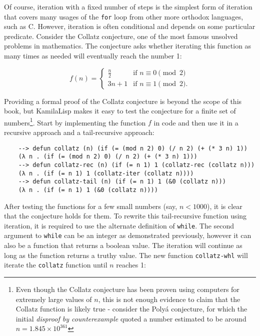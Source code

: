 Of course, iteration with a fixed number of steps is the simplest form of iteration that covers many usages of the \verb|for| loop from other more orthodox languages, such as C. However, iteration is often conditional and depends on some particular predicate. Consider the Collatz conjecture, one of the most famous unsolved problems in mathematics. The conjecture asks whether iterating this function as many times as needed will eventually reach the number 1:

\begin{equation*}
    f(n)={\begin{cases}{\frac {n}{2}}&{\text{if }}n\equiv 0{\pmod {2}}\\[4px]3n+1&{\text{if }}n\equiv 1{\pmod {2}}.\end{cases}}
\end{equation*}

Providing a formal proof of the Collatz conjecture is beyond the scope of this book, but KamilaLisp makes it easy to test the conjecture for a finite set of numbers\footnote{Even though the Collatz conjecture has been proven using computers for extremely large values of $n$, this is not enough evidence to claim that the Collatz function is likely true - consider the Polyá conjecture, for which the initial \textit{disproof by counterexample} quoted a number estimated to be around $n = 1.845 \times 10^{361}$}. Start by implementing the function $f$ in code and then use it in a recursive approach and a tail-recursive approach:

\begin{Verbatim}
    --> defun collatz (n) (if (= (mod n 2) 0) (/ n 2) (+ (* 3 n) 1))
    (λ n . (if (= (mod n 2) 0) (/ n 2) (+ (* 3 n) 1)))
    --> defun collatz-rec (n) (if (= n 1) 1 (collatz-rec (collatz n)))
    (λ n . (if (= n 1) 1 (collatz-iter (collatz n))))
    --> defun collatz-tail (n) (if (= n 1) 1 (&0 (collatz n)))
    (λ n . (if (= n 1) 1 (&0 (collatz n))))
\end{Verbatim}

After testing the functions for a few small numbers (say, $n < 1000$), it is clear that the conjecture holds for them. To rewrite this tail-recursive function using iteration, it is required to use the alternate definition of \verb|while|. The second argument to \verb|while| can be an integer as demonstrated previously, however it can also be a function that returns a boolean value. The iteration will continue as long as the function returns a truthy value. The new function \verb|collatz-whl| will iterate the \verb|collatz| function until $n$ reaches 1:

